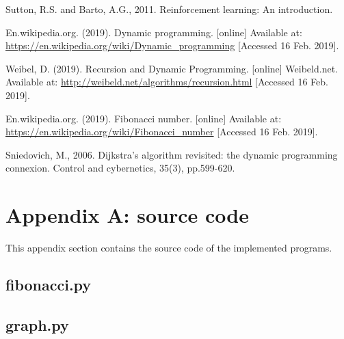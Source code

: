 \documentclass[runningheads]{llncs}
\begin{document}
\begin{thebibliography}{8}

Sutton, R.S. and Barto, A.G., 2011. Reinforcement learning: An introduction.

En.wikipedia.org. (2019). Dynamic programming. [online] Available at: \url{https://en.wikipedia.org/wiki/Dynamic\_programming} [Accessed 16 Feb. 2019].

Weibel, D. (2019). Recursion and Dynamic Programming. [online] Weibeld.net. Available at: \url{http://weibeld.net/algorithms/recursion.html} [Accessed 16 Feb. 2019].

En.wikipedia.org. (2019). Fibonacci number. [online] Available at: \url{https://en.wikipedia.org/wiki/Fibonacci\_number} [Accessed 16 Feb. 2019].

Sniedovich, M., 2006. Dijkstra's algorithm revisited: the dynamic programming connexion. Control and cybernetics, 35(3), pp.599-620.

\end{thebibliography}


\section{Appendix A: source code}\label{appendix}
This appendix section contains the source code of the implemented programs.

\subsection{fibonacci.py}\label{fibonacci_code}


\subsection{graph.py}\label{graph_code}

\end{document}
